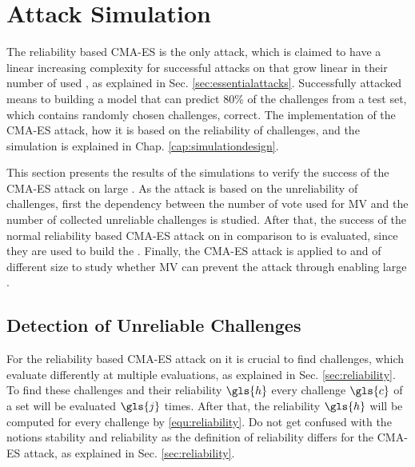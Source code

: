 \chapter{Attack Simulation}
\label{cap:attacksimulations}


The reliability based \ac{CMA-ES} is the only attack, which is claimed to have a linear increasing complexity for successful attacks on \xpufs that grow linear in their number of used \apufs, as explained in Sec. \ref{sec:essentialattacks}.
Successfully attacked means to building a model that can predict $80 \%$ of the challenges from a test set, which contains randomly chosen challenges, correct.
The implementation of the \ac{CMA-ES} attack, how it is based on the reliability of challenges, and the \apuf simulation is explained in Chap. \ref{cap:simulationdesign}.

This section presents the results of the simulations to verify the success of the \ac{CMA-ES} attack on large \xpufs.
As the attack is based on the unreliability of challenges, first the dependency between the number of vote used for \ac{MV} and the number of collected unreliable challenges is studied.
After that, the success of the normal reliability based \ac{CMA-ES} attack on \mpufs in comparison to \apufs is evaluated, since they are used to build the \mxpuf.
Finally, the \ac{CMA-ES} attack is applied to \xpufs and \mxpufs of different size to study whether \ac{MV} can prevent the attack through enabling large \mxpufs. 


\section{Detection of Unreliable Challenges}
\label{sec:detectionofunreliablechallenges}

For the reliability based \ac{CMA-ES} attack on \apufs it is crucial to find challenges, which evaluate differently at multiple evaluations, as explained in Sec. \ref{sec:reliability}.
To find these challenges and their reliability $\gls{h}$ every challenge $\gls{c}$ of a set will be evaluated $\gls{j}$ times.
After that, the reliability $\gls{h}$ will be computed for every challenge by \ref{equ:reliability}.
Do not get confused with the notions stability and reliability as the definition of reliability differs for the \ac{CMA-ES} attack, as explained in Sec. \ref{sec:reliability}.

